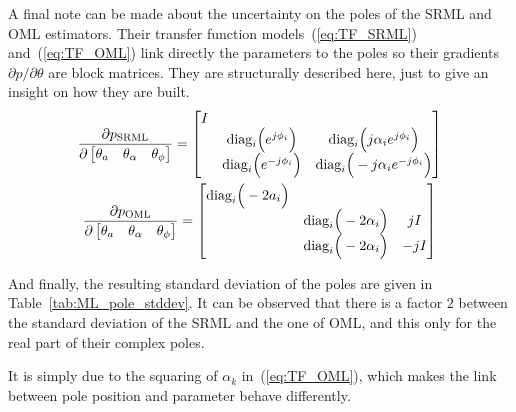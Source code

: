 A final note can be made about the uncertainty on the poles of the SRML and OML estimators. Their transfer function models~(\ref{eq:TF_SRML}) and~(\ref{eq:TF_OML}) link directly the parameters to the poles so their gradients $\partial p / \partial \theta$ are block matrices. They are structurally described here, just to give an insight on how they are built.
\begin{gather}
    \frac{\partial p_{\text{SRML}}}{\partial \begin{bmatrix}
        \theta_a & \theta_\alpha & \theta_\phi
    \end{bmatrix}} = \begin{bmatrix}
        I & &\\
        & \text{diag}_i \Big(e^{j\phi_i}\Big) & \text{diag}_i \Big(j\alpha_i e^{j\phi_i}\Big)\\
        & \text{diag}_i \Big(e^{-j\phi_i}\Big) & \text{diag}_i \Big(-j\alpha_i e^{-j\phi_i}\Big)\\
    \end{bmatrix} \notag \\
    \frac{\partial p_{\text{OML}}}{\partial \begin{bmatrix}
        \theta_a & \theta_\alpha & \theta_\phi
    \end{bmatrix}} = \begin{bmatrix}
        \text{diag}_i \Big(-2a_i\Big) & &\\
        & \text{diag}_i \Big(-2\alpha_i\Big) & j I\\
        & \text{diag}_i \Big(-2\alpha_i\Big) & -j I\\
    \end{bmatrix} \notag 
\end{gather}

And finally, the resulting standard deviation of the poles are given in Table~\ref{tab:ML_pole_stddev}. It can be observed that there is a factor $2$ between the standard deviation of the SRML and the one of OML, and this only for the real part of their complex poles. 


It is simply due to the squaring of $\alpha_k$ in~(\ref{eq:TF_OML}), which makes the link between pole position and parameter behave differently.

